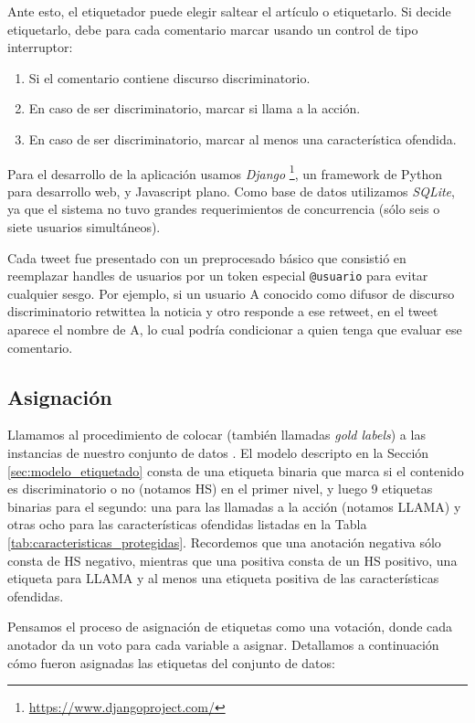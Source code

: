 Ante esto, el etiquetador puede elegir saltear el artículo o etiquetarlo. Si decide etiquetarlo, debe para cada comentario marcar usando un control de tipo interruptor:

\begin{enumerate}
    \item Si el comentario contiene discurso discriminatorio.
    \item En caso de ser discriminatorio, marcar si llama a la acción.
    \item En caso de ser discriminatorio, marcar al menos una característica ofendida.
\end{enumerate}

Para el desarrollo de la aplicación usamos \emph{Django} \footnote{\url{https://www.djangoproject.com/}}, un framework de Python para desarrollo web, y Javascript plano. Como base de datos utilizamos \emph{SQLite}, ya que el sistema no tuvo grandes requerimientos de concurrencia (sólo seis o siete usuarios simultáneos).


Cada tweet fue presentado con un preprocesado básico que consistió en reemplazar handles de usuarios por un token especial \verb|@usuario| para evitar cualquier sesgo. Por ejemplo, si un usuario A conocido como difusor de discurso discriminatorio retwittea la noticia y otro responde a ese retweet, en el tweet aparece el nombre de A, lo cual podría condicionar a quien tenga que evaluar ese comentario.


\subsection{Asignación}
\label{sec:asignacion}

Llamamos  al procedimiento de colocar  (también llamadas \emph{gold labels}) a las instancias de nuestro conjunto de datos \cite{pustejovsky2012natural}. El modelo descripto en la Sección \ref{sec:modelo_etiquetado} consta de una etiqueta binaria que marca si el contenido es discriminatorio o no (notamos HS) en el primer nivel, y luego 9 etiquetas binarias para el segundo: una para las llamadas a la acción (notamos LLAMA) y otras ocho para las características ofendidas listadas en la Tabla \ref{tab:caracteristicas_protegidas}. Recordemos que una anotación negativa sólo consta de HS negativo, mientras que una positiva consta de un HS positivo, una etiqueta para LLAMA y al menos una etiqueta positiva de las características ofendidas.

Pensamos el proceso de asignación de etiquetas como una votación, donde cada anotador da un voto para cada variable a asignar. Detallamos a continuación cómo fueron asignadas las etiquetas del conjunto de datos:

